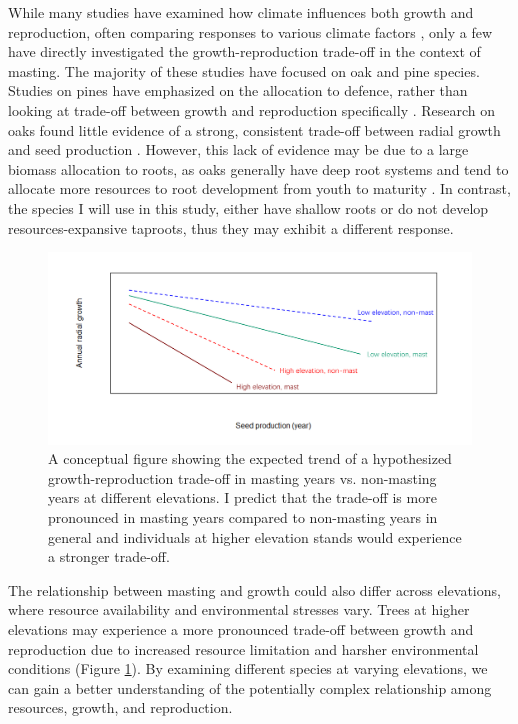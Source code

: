 \documentclass[11pt,letter]{article}
\begin{document}
While many studies have examined how climate influences both growth and reproduction, often comparing responses to various climate factors \citep{bajocco2021characterizing, koenig2020can, redmond2019resource, sanchez2011trade}, only a few have directly investigated the growth-reproduction trade-off in the context of masting. The majority of these studies have focused on oak and pine species. Studies on pines have emphasized on the allocation to defence, rather than looking at trade-off between growth and reproduction specifically \citep{larrinaga2024resource, redmond2019resource}. Research on oaks found little evidence of a strong, consistent trade-off between radial growth and seed production \citep{koenig2020can, patterson2023acorn}. However, this lack of evidence may be due to a  large biomass allocation to roots, as oaks generally have deep root systems and tend to allocate more resources to root development from youth to maturity \citep{burns1990silvics}. In contrast, the species I will use in this study, either have shallow roots or do not develop resources-expansive taproots, thus they may exhibit a different response.\par
\begin{figure}[htb]
	\centering
	\includegraphics[width=1\linewidth]{conceptualFigureChap2.png}
	\caption{A conceptual figure showing the expected trend of a hypothesized growth-reproduction trade-off in masting years vs. non-masting years at different elevations. I predict that the trade-off is more pronounced in masting years compared to non-masting years in general and individuals at higher elevation stands would experience a stronger trade-off.}
	\label{fig:conceptual2}
\end{figure}
The relationship between masting and growth could also differ across elevations, where resource availability and environmental stresses vary. Trees at higher elevations may experience a more pronounced trade-off between growth and reproduction due to increased resource limitation and harsher environmental conditions (Figure \ref{fig:conceptual2}). By examining different species at varying elevations, we can gain a better understanding of the potentially complex relationship among resources, growth, and reproduction.\par
\end{document}
